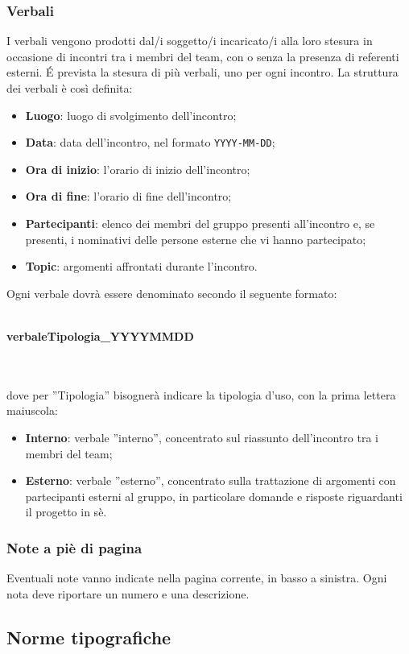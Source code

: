 \subsubsection{Verbali}
I verbali vengono prodotti dal/i soggetto/i incaricato/i alla loro stesura in occasione di incontri tra i membri del team, con o senza la presenza di referenti esterni. \'E prevista la stesura di più verbali, uno per ogni incontro.
La struttura dei verbali è così definita: \begin{itemize}
\item \textbf{Luogo}: luogo di svolgimento dell'incontro;
\item \textbf{Data}: data dell'incontro, nel formato \texttt{YYYY-MM-DD};
\item \textbf{Ora di inizio}: l'orario di inizio dell'incontro;
\item \textbf{Ora di fine}: l'orario di fine dell'incontro;
\item \textbf{Partecipanti}: elenco dei membri del gruppo presenti all'incontro e, se presenti, i nominativi delle persone esterne che vi hanno partecipato;
\item \textbf{Topic}: argomenti affrontati durante l'incontro.
\end{itemize}
Ogni verbale dovrà essere denominato secondo il seguente formato: \\ \\
\centerline{\textbf{verbaleTipologia\_YYYYMMDD}} \\ \\
dove per ''Tipologia'' bisognerà indicare la tipologia d'uso, con la prima lettera maiuscola: \begin{itemize}
\item \textbf{Interno}: verbale ''interno'', concentrato sul riassunto dell'incontro tra i membri del team;
\item \textbf{Esterno}: verbale ''esterno'', concentrato sulla trattazione di argomenti con partecipanti esterni al gruppo, in particolare domande e risposte riguardanti il progetto in sè.
\end{itemize}

\subsubsection{Note a piè di pagina}
Eventuali note vanno indicate nella pagina corrente, in basso a sinistra. Ogni nota deve riportare un numero e una descrizione.

\subsection{Norme tipografiche}
